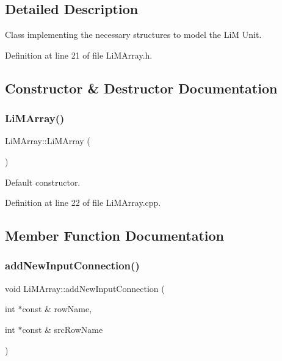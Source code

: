 \subsection{Detailed Description}
Class implementing the necessary structures to model the LiM Unit. 

Definition at line 21 of file Li\+M\+Array.\+h.



\subsection{Constructor \& Destructor Documentation}
\mbox{\label{classoctantis_1_1LiMArray_a135b6437641126fff154d8d779232387}} 
\subsubsection{\texorpdfstring{Li\+M\+Array()}{LiMArray()}}
{\footnotesize\ttfamily Li\+M\+Array\+::\+Li\+M\+Array (\begin{DoxyParamCaption}{ }\end{DoxyParamCaption})}



Default constructor. 



Definition at line 22 of file Li\+M\+Array.\+cpp.



\subsection{Member Function Documentation}
\mbox{\label{classoctantis_1_1LiMArray_a9732e49054f17cb15d68729c26b3fc21}} 
\subsubsection{\texorpdfstring{add\+New\+Input\+Connection()}{addNewInputConnection()}}
{\footnotesize\ttfamily void Li\+M\+Array\+::add\+New\+Input\+Connection (\begin{DoxyParamCaption}\item[{int $\ast$const \&}]{row\+Name,  }\item[{int $\ast$const \&}]{src\+Row\+Name }\end{DoxyParamCaption})}



